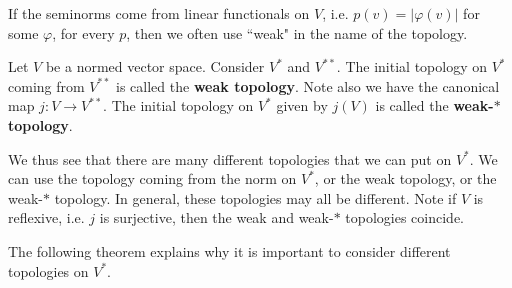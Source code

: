 \documentclass[a4paper,12pt]{report}
\newcommand{\vphi} {\varphi}
\newenvironment{definition}[1][Definition.]{\begin{trivlist}
\item[\hskip \labelsep {\bfseries #1}]}{\end{trivlist}}
\newenvironment{remark}[1][Remark.]{\begin{trivlist}
\item[\hskip \labelsep {\bfseries #1}]}{\end{trivlist}}
\begin{document}
	\begin{remark}
	If the seminorms come from linear functionals on $V$, i.e. $p(v) = |\vphi(v)|$ for some $\vphi$, for every $p$, then we often use ``weak" in the name of the topology. 
	\end{remark}

	\begin{definition}
	Let $V$ be a normed vector space. Consider $V^*$ and $V^{**}$. The initial topology on $V^*$ coming from $V^{**}$ is called the \textbf{weak topology}. Note also we have the canonical map $j : V \rightarrow V^{**}$. The initial topology on $V^*$ given by $j(V)$ is called the \textbf{weak-$\ast$ topology}. 
	\end{definition}
	
	\noindent We thus see that there are many different topologies that we can put on $V^*$. We can use the topology coming from the norm on $V^*$, or the weak topology, or the weak-$\ast$ topology. In general, these topologies may all be different. Note if $V$ is reflexive, i.e. $j$ is surjective, then the weak and weak-$\ast$ topologies coincide.
	
	The following theorem explains why it is important to consider different topologies on $V^*$. 
	
\end{document}
